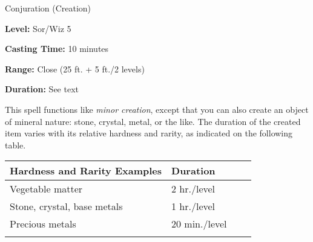 
Conjuration (Creation)

\textbf{Level:} Sor/Wiz 5

\textbf{Casting Time:} 10 minutes

\textbf{Range:} Close (25 ft. + 5 ft./2 levels)

\textbf{Duration:} See text

This spell functions like \textit{minor creation}, except that you can also create 
an object of mineral nature: stone, crystal, metal, or the like. The duration of 
the created item varies with its relative hardness and rarity, as indicated on 
the following table.

\begin{longtable}{llll}
\hline
\multicolumn{1}{|p{2.069in}|}{\begin{minipage}[t]{2.069in}\raggedright
\textbf{Hardness and Rarity Examples}\end{minipage}} & \multicolumn{1}{p{1.000in}|}{\begin{minipage}[t]{1.000in}\raggedright
\textbf{Duration}\end{minipage}}\\
\hline
\multicolumn{1}{p{0.069in}|}{\begin{minipage}[t]{0.069in}\raggedright
Vegetable matter\end{minipage}} & \multicolumn{1}{p{0.069in}|}{\begin{minipage}[t]{0.069in}\raggedright
2 hr./level\end{minipage}}\\
\hline
\multicolumn{1}{|p{2.069in}|}{\begin{minipage}[t]{2.069in}\raggedright
Stone, crystal, base metals\end{minipage}} & \multicolumn{1}{p{1.000in}|}{\begin{minipage}[t]{1.000in}\raggedright
1 hr./level\end{minipage}}\\
\hline
\multicolumn{1}{p{0.069in}|}{\begin{minipage}[t]{0.069in}\raggedright
Precious metals\end{minipage}} & \multicolumn{1}{p{0.069in}|}{\begin{minipage}[t]{0.069in}\raggedright
20 min./level\end{minipage}}\\
\hline
\multicolumn{1}{|p{2.069in}|}{\begin{minipage}[t]{2.069in}\raggedright

\end{minipage}}
\end{longtable}
